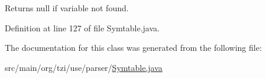 \begin{DoxyReturn}{Returns}
null if variable not found. 
\end{DoxyReturn}


Definition at line 127 of file Symtable.\-java.



The documentation for this class was generated from the following file\-:\begin{DoxyCompactItemize}
\item 
src/main/org/tzi/use/parser/\hyperlink{_symtable_8java}{Symtable.\-java}\end{DoxyCompactItemize}
